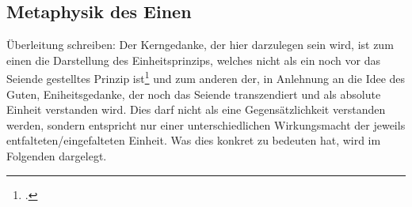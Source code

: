 

\subsection{Metaphysik des Einen}
Überleitung schreiben:
Der Kerngedanke, der hier darzulegen sein wird, ist zum einen die Darstellung des Einheitsprinzips, welches nicht als ein noch vor das Seiende gestelltes Prinzip ist\footcite[vgl.][S.99]{halfwassen2015spuren} und zum anderen der, in Anlehnung an die Idee des Guten, Eniheitsgedanke, der noch das Seiende transzendiert und als absolute Einheit verstanden wird. Dies darf nicht als eine Gegensätzlichkeit verstanden werden, sondern entspricht nur einer unterschiedlichen Wirkungsmacht der jeweils entfalteten/eingefalteten Einheit. Was dies konkret zu bedeuten hat, wird im Folgenden dargelegt.
